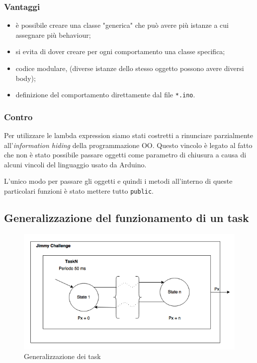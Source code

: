 \subsubsection{Vantaggi}
\begin{itemize}
	\item è possibile creare una classe "generica" che può avere più istanze a cui assegnare più behaviour;
	\item si evita di dover creare per ogni comportamento una classe specifica;
	\item codice modulare, (diverse istanze dello stesso oggetto possono avere diversi body);
	\item definizione del comportamento direttamente dal file \texttt{*.ino}.
\end{itemize}

\subsubsection{Contro}
Per utilizzare le lambda expression siamo stati costretti a rinunciare parzialmente all'\textit{information hiding} della programmazione OO. Questo vincolo è legato al fatto che non è stato possibile passare oggetti come parametro di chiusura a causa di alcuni vincoli del linguaggio usato da Arduino.

L'unico modo per passare gli oggetti e quindi i metodi all'interno di queste particolari funzioni è stato mettere tutto \texttt{public}.

\subsection{Generalizzazione del funzionamento di un task}
\begin{figure}[!ht]
	\centering
	\includegraphics[scale=.60]{img/task_generic.png}
	\caption{Generalizzazione dei task}
\end{figure}

